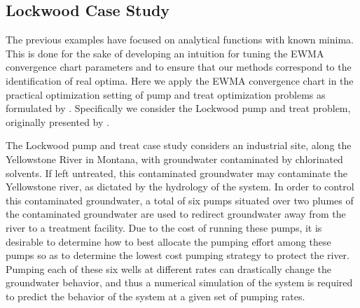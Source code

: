 \documentclass[12pt]{article}
\begin{document}
%
%
\subsection{Lockwood Case Study}
\label{sec:lockwood}
%
%

The previous examples have focused on analytical functions with known minima.
%
This is done for the sake of developing an intuition for tuning the EWMA convergence chart parameters and to ensure that our methods correspond to the identification of real optima.
Here we apply the EWMA convergence chart in the practical optimization setting of pump and treat optimization problems as formulated by \cite{mayer2002optimal}.
%
Specifically we consider the Lockwood pump and treat problem, originally presented by \cite{lockCite}. %

%
%


The Lockwood pump and treat case study considers an industrial site, along the Yellowstone River in Montana, with groundwater contaminated by chlorinated solvents. %
%
If left untreated, this contaminated groundwater may contaminate the Yellowstone river, as dictated by the hydrology of the system. %
In order to control this contaminated groundwater, a total of six pumps situated over two plumes of the contaminated groundwater are used to redirect groundwater away from the river to a treatment facility.
%
Due to the cost of running these pumps, it is desirable to determine how to best allocate the pumping effort among these pumps so as to determine the lowest cost pumping strategy to protect the river.
%
Pumping each of these six wells at different rates can drastically change the groundwater behavior, and  thus a numerical simulation of the system is required to predict the behavior of the system at a given set of pumping rates. %
%
%
\end{document}
